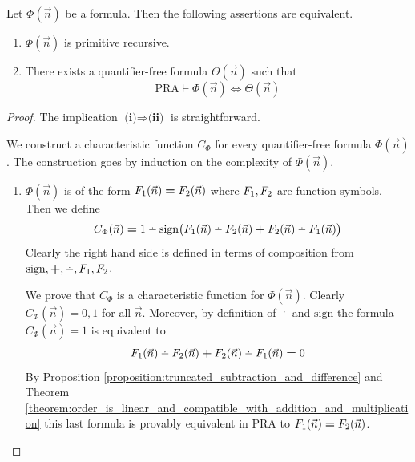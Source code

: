 \documentclass[10pt]{amsart}
\newcommand{\mequiv}{\boldsymbol{\Leftrightarrow}}
\newcommand{\meq}{\boldsymbol{=}}
\newcommand{\mplus}{\boldsymbol{+}}
\begin{document}
\begin{theorem}\label{theorem:primitive_recursive_are_equivalent_to_quantifier_free}
	Let $\Phi(\vec{n})$ be a formula. Then the following assertions are equivalent.
	\begin{enumerate}[label=\emph{\textbf{(\roman*)}}, leftmargin=3.0em]
		\item $\Phi(\vec{n})$ is primitive recursive.
		\item There exists a quantifier-free formula $\Theta(\vec{n})$ such that
		      $$\mathrm{PRA}\vdash \Phi(\vec{n}) \mequiv \Theta(\vec{n})$$
	\end{enumerate}
\end{theorem}
\begin{proof}
	The implication $\textbf{(i)} \Rightarrow \textbf{(ii)}$ is straightforward.

	We construct a characteristic function $C_{\Phi}$ for every quantifier-free formula $\Phi(\vec{n})$. The construction goes by induction on the complexity of $\Phi(\vec{n})$.
	\begin{enumerate}[label=\textbf{(\arabic*)}, leftmargin=3.0em]
    \item $\Phi(\vec{n})$ is of the form $F_{\rm{1}}(\vec{n}) \meq F_{\rm{2}}(\vec{n})$ where $F_{\rm{1}},F_{\rm{2}}$ are function symbols. Then we define
		      $$C_{\Phi}(\vec{n}) \meq 1 \dotminus \mathrm{sign}\big(F_{\rm{1}}(\vec{n}) \dotminus F_{\rm{2}}(\vec{n}) \mplus F_{\rm{2}}(\vec{n}) \dotminus F_{\rm{1}}(\vec{n})\big)$$
		      Clearly the right hand side is defined in terms of composition from $\mathrm{sign},\mplus,\dotminus,F_{\rm{1}},F_{\rm{2}}$.

		      We prove that $C_{\Phi}$ is a characteristic function for $\Phi(\vec{n})$. Clearly $C_{\Phi}(\vec{n}) \meq 0,1$ for all $\vec{n}$. Moreover, by definition of $\dotminus$ and $\mathrm{sign}$ the formula $C_{\Phi}(\vec{n}) \meq 1$ is equivalent to
		      $$F_{\rm{1}}(\vec{n}) \dotminus F_{\rm{2}}(\vec{n}) \mplus F_{\rm{2}}(\vec{n}) \dotminus F_{\rm{1}}(\vec{n}) \meq 0$$
		      By Proposition \ref{proposition:truncated_subtraction_and_difference} and Theorem \ref{theorem:order_is_linear_and_compatible_with_addition_and_multiplication} this last formula is provably equivalent in $\mathrm{PRA}$ to $F_{\rm{1}}(\vec{n}) \meq F_{\rm{2}}(\vec{n})$.


\end{enumerate}
\end{proof}
\end{document}
